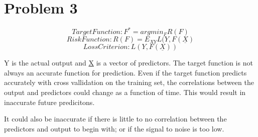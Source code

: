 \documentclass[11pt]{article}
\begin{document}
\begin{center}

\ \\
\end{center}

\section*{Problem 3}

$$Target Function: F^* = argmin_FR(F)$$
$$Risk Function: R(F) = E_{XY}L(Y, F(\underline{X})$$
$$Loss Criterion: L(Y,F(\underline{X}))$$

Y is the actual output and \underline{X} is a vector of predictors. The target function is not always an accurate function for prediction. Even if the target function predicts accurately with cross vallidation on the training set, the correlations between the output and predictors could change as a function of time. This would result in inaccurate future predicitons. 

It could also be inaccurate if there is little to no correlation between the predictors and output to begin with; or if the signal to noise is too low. 
\end{document}
